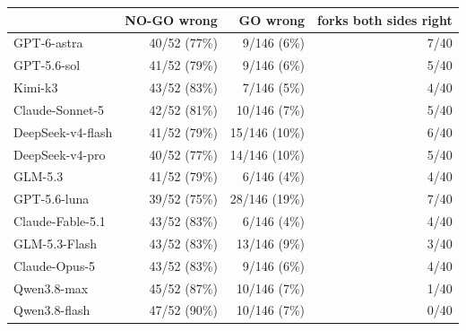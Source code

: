 \begin{tabular}{@{}lrrr@{}}
\toprule
 & NO-GO wrong & GO wrong & forks both sides right \\
\midrule
GPT-6-astra & 40/52 (77\%) & 9/146 (6\%) & 7/40 \\
GPT-5.6-sol & 41/52 (79\%) & 9/146 (6\%) & 5/40 \\
Kimi-k3 & 43/52 (83\%) & 7/146 (5\%) & 4/40 \\
Claude-Sonnet-5 & 42/52 (81\%) & 10/146 (7\%) & 5/40 \\
DeepSeek-v4-flash & 41/52 (79\%) & 15/146 (10\%) & 6/40 \\
DeepSeek-v4-pro & 40/52 (77\%) & 14/146 (10\%) & 5/40 \\
GLM-5.3 & 41/52 (79\%) & 6/146 (4\%) & 4/40 \\
GPT-5.6-luna & 39/52 (75\%) & 28/146 (19\%) & 7/40 \\
Claude-Fable-5.1 & 43/52 (83\%) & 6/146 (4\%) & 4/40 \\
GLM-5.3-Flash & 43/52 (83\%) & 13/146 (9\%) & 3/40 \\
Claude-Opus-5 & 43/52 (83\%) & 9/146 (6\%) & 4/40 \\
Qwen3.8-max & 45/52 (87\%) & 10/146 (7\%) & 1/40 \\
Qwen3.8-flash & 47/52 (90\%) & 10/146 (7\%) & 0/40 \\
\bottomrule
\end{tabular}
